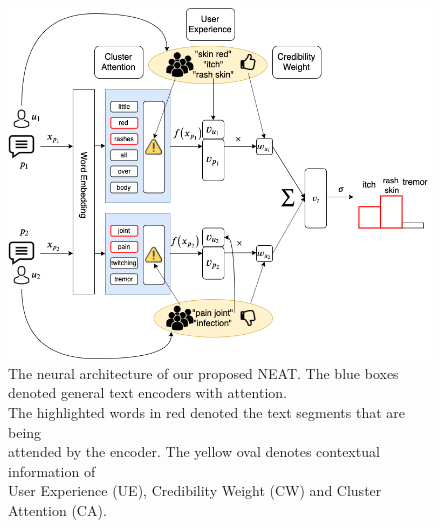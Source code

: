\documentclass{bmcart}
\begin{document}
\begin{figure}
    \centering
    \captionsetup{justification=centering}
    \includegraphics[scale=0.4]{neat.png}
    \caption{The neural architecture of our proposed NEAT. The blue boxes \\ denoted general text encoders with attention. \\ The highlighted words in red denoted the text segments that are being \\ attended by the encoder. The yellow oval denotes contextual information of \\ User Experience (UE), Credibility Weight (CW) and Cluster Attention (CA).}
    \label{fig:NEAT}
\end{figure}
\end{document}
